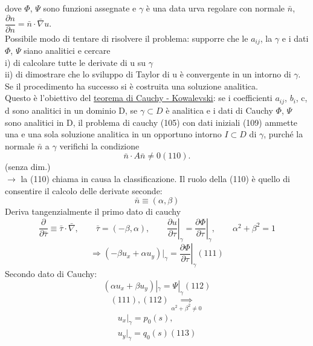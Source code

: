 \documentclass[a4paper,11pt]{report}
\begin{document}
dove $\Phi$, $\Psi$ sono funzioni assegnate e $\gamma$ è una data urva regolare con normale $\bar{n}$, $\dfrac{\partial n}{\partial n}=\bar{n}\cdot\bar{\nabla} u$.\\
Possibile modo di tentare di risolvere il problema: supporre che le $a_{ij}$, la $\gamma$ e i dati $\Phi$, $\Psi$ siano analitici e cercare \\
i) di calcolare tutte le derivate di u su $\gamma$\\
ii) di dimostrare che lo sviluppo di Taylor di u è convergente in un intorno di $\gamma$.\\
Se il procedimento ha successo si è costruita una soluzione analitica. \\
Questo è l'obiettivo del \underline{teorema di Cauchy - Kowalevski}: se i coefficienti $a_{ij}$, $b_i$, c, d sono analitici in un dominio D, se $\gamma \subset D$ è analitica e i dati di Cauchy $\Phi$, $\Psi$ sono analitici in D, il problema di cauchy (105) con dati iniziali (109) ammette una e una sola soluzione analitica in un opportuno intorno $I\subset D$ di $\gamma$, purché la normale $\bar{n}$ a $\gamma$ verifichi la condizione 
\begin{equation}
\bar{n}\cdot A \bar{n}\neq 0 (110).
\end{equation}
(senza dim.)\\
$\rightarrow$ la (110) chiama in causa la classificazione.
Il ruolo della (110) è quello di consentire il calcolo delle derivate seconde:
$$
\bar{n}\equiv (\alpha,\beta)
$$
Deriva tangenzialmente il primo dato di cauchy
$$
\dfrac{\partial}{\partial\bar{\tau}} \equiv \bar{\tau}\cdot \bar{\nabla}, \qquad \bar{\tau}= (-\beta,\alpha), \qquad \left.\dfrac{\partial u}{\partial \tau}\right|_{\gamma} = \left. \dfrac{\partial \Phi}{\partial \tau}\right|_{\gamma}, \qquad \alpha^2 + \beta^2 =1
$$
\begin{equation}
\Rightarrow (-\beta u_x +\alpha u_y)|_{\gamma}=\left.\dfrac{\partial \Phi}{\partial \tau}\right|_{\gamma} (111)
\end{equation}
Secondo dato di Cauchy:
\begin{equation}
(\alpha u_x + \beta u_y)|_{\gamma} = \Psi|_{\gamma} (112)
\end{equation}
$$
(111),(112) \underset{\alpha^2 + \beta^2 \neq 0}{\implies} 
$$
\begin{eqnarray}
u_x|_{\gamma}=p_0(s),\\
u_y|_{\gamma}=q_0(s) (113)
\end{eqnarray}
\end{document}
